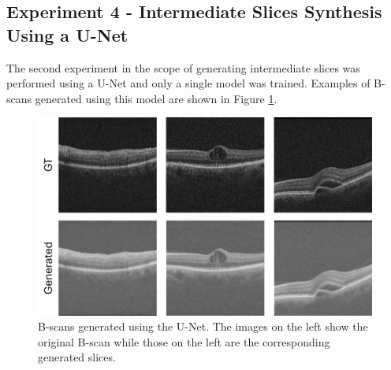 \subsection{Experiment 4 - Intermediate Slices Synthesis Using a U-Net}

The second experiment in the scope of generating intermediate slices was performed using a U-Net and only a single model was trained. Examples of B-scans generated using this model are shown in Figure \ref{fig:GenerativeUNetResults}.

\begin{figure}[!ht]
	\centering	\includegraphics[width=1.0\linewidth]{figures/GenerativeUNetResults.png}
	\caption{B-scans generated using the U-Net. The images on the left show the original B-scan while those on the left are the corresponding generated slices.}
	\label{fig:GenerativeUNetResults}
\end{figure}

